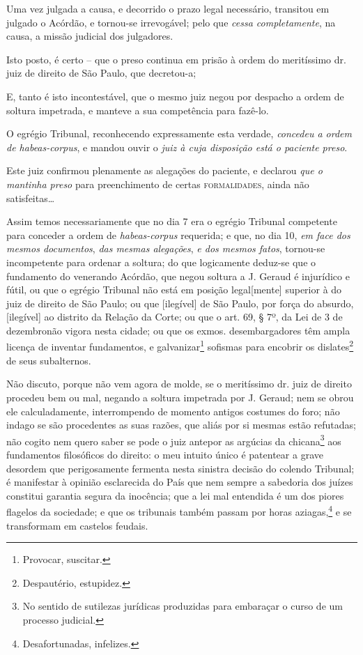 Uma vez julgada a causa, e decorrido o prazo legal necessário, transitou
em julgado o Acórdão, e tornou-se irrevogável; pelo que \emph{cessa
completamente}, na causa, a missão judicial dos julgadores.

Isto posto, é certo -- que o preso continua em prisão à ordem do
meritíssimo dr. juiz de direito de São Paulo, que decretou-a;

E, tanto é isto incontestável, que o mesmo juiz negou por despacho a
ordem de soltura impetrada, e manteve a sua competência para fazê-lo.

O egrégio Tribunal, reconhecendo expressamente esta verdade,
\emph{concedeu a ordem de habeas-corpus}, e mandou ouvir o \emph{juiz à
cuja disposição está o paciente preso}.

Este juiz confirmou plenamente as alegações do paciente, e declarou
\emph{que o mantinha preso} para preenchimento de certas \textsc{formalidades},
ainda não satisfeitas\ldots{}

Assim temos necessariamente que no dia 7 era o egrégio Tribunal
competente para conceder a ordem de \emph{habeas-corpus} requerida; e
que, no dia 10, \emph{em face dos mesmos documentos}, \emph{das mesmas
alegações}, \emph{e dos mesmos fatos}, tornou-se incompetente para
ordenar a soltura; do que logicamente deduz-se que o fundamento do
venerando Acórdão, que negou soltura a J. Geraud é injurídico e fútil,
ou que o egrégio Tribunal não está em posição legal{[}mente{]} superior
à do juiz de direito de São Paulo; ou que {[}ilegível{]} de São Paulo, por
força do absurdo, {[}ilegível{]} ao distrito da Relação da Corte; ou que
o art. 69, § 7º, da Lei de 3 de dezembronão vigora nesta cidade; ou que
os exmos. desembargadores têm ampla licença de inventar fundamentos, e
galvanizar\footnote{ Provocar, suscitar.} sofismas para encobrir os
dislates\footnote{ Despautério, estupidez.} de seus subalternos.

Não discuto, porque não vem agora de molde, se o meritíssimo dr. juiz de
direito procedeu bem ou mal, negando a soltura impetrada por J. Geraud;
nem se obrou ele calculadamente, interrompendo de momento antigos
costumes do foro; não indago se são procedentes as suas razões, que
aliás por si mesmas estão refutadas; não cogito nem quero saber se pode
o juiz antepor as argúcias da chicana\footnote{ No sentido de sutilezas
  jurídicas produzidas para embaraçar o curso de um processo judicial.}
aos fundamentos filosóficos do direito: o meu intuito único é patentear
a grave desordem que perigosamente fermenta nesta sinistra decisão do
colendo Tribunal; é manifestar à opinião esclarecida do País que nem
sempre a sabedoria dos juízes constitui garantia segura da inocência;
que a lei mal entendida é um dos piores flagelos da sociedade; e que os
tribunais também passam por horas aziagas,\footnote{ Desafortunadas,
  infelizes.} e se transformam em castelos feudais.

